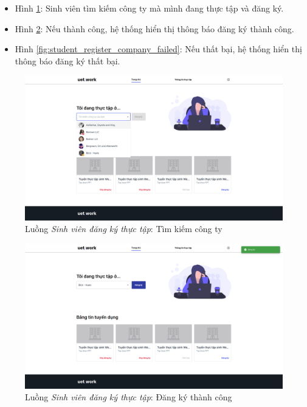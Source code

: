 \documentclass[./../main.tex]{subfiles}
\begin{document}
\begin{itemize}
	\item Hình \ref{fig:student_find_company}: Sinh viên tìm kiếm công ty mà mình đang thực tập và đăng ký.
	\item Hình \ref{fig:student_register_company_success}: Nếu thành công, hệ thống hiển thị thông báo đăng ký thành công.
	\item Hình \ref{fig:student_register_company_failed}: Nếu thất bại, hệ thống hiển thị thông báo đăng ký thất bại.
\end{itemize}

\begin{figure}[]
	\includegraphics[width=\linewidth]{./images/image39.png}
	\caption{Luồng \emph{Sinh viên đăng ký thực tập}: Tìm kiếm công ty}
	\label{fig:student_find_company}
\end{figure}

\begin{figure}[]
	\includegraphics[width=\linewidth]{./images/image40-1.png}
	\caption{Luồng \emph{Sinh viên đăng ký thực tập}: Đăng ký thành công}
	\label{fig:student_register_company_success}
\end{figure}
\end{document}

